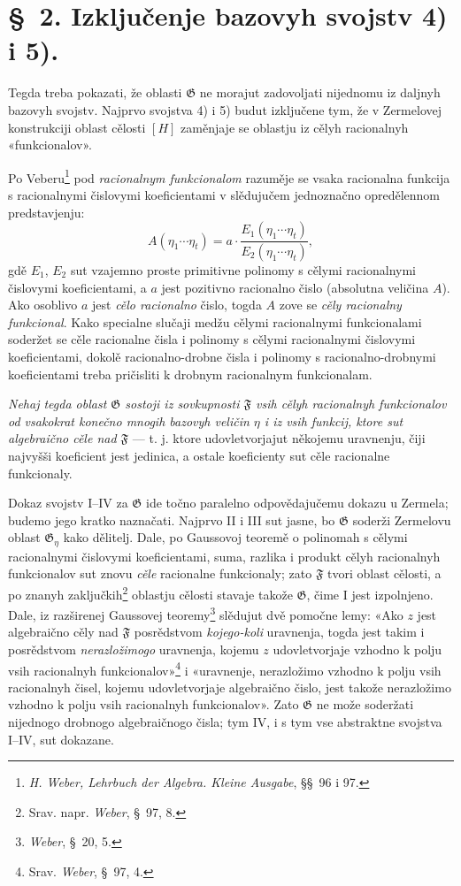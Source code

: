 \documentclass[11pt]{article}
\begin{document}
\section*{\S\ 2. Izključenje bazovyh svojstv 4) i 5).}

Tegda treba pokazati, že oblasti $\mathfrak G$ ne morajut zadovoljati nijednomu iz daljnyh bazovyh svojstv. Najprvo svojstva 4) i 5) budut izključene tym, že v Zermelovej konstrukciji oblast cělosti $[H]$ zaměnjaje se oblastju iz cělyh racionalnyh «funkcionalov».

Po Veberu\footnote{\emph{H. Weber, Lehrbuch der Algebra. Kleine Ausgabe}, \S\S\ 96 i 97.} pod {\itshape racionalnym funkcionalom} razuměje se vsaka racionalna funkcija s racionalnymi čislovymi koeficientami v slědujučem jednoznačno opredělennom predstavjenju:
\[
 A(\eta_1\cdots \eta_t)
   = a\cdot\frac{E_1(\eta_1\cdots \eta_t)}{E_2(\eta_1\cdots \eta_t)},
\]
gdě $E_1$, $E_2$ sut vzajemno proste primitivne polinomy s cělymi racionalnymi čislovymi koeficientami, a $a$ jest pozitivno racionalno čislo (absolutna veličina $A$). Ako osoblivo $a$ jest {\itshape cělo racionalno} čislo, togda $A$ zove se {\itshape cěly racionalny funkcional}. Kako specialne slučaji medžu cělymi racionalnymi funkcionalami soderžet se cěle racionalne čisla i polinomy s cělymi racionalnymi čislovymi koeficientami, dokolě racionalno-drobne čisla i polinomy s racionalno-drobnymi koeficientami treba pričisliti k drobnym racionalnym funkcionalam.

{\itshape Nehaj tegda oblast $\mathfrak G$ sostoji iz sovkupnosti $\mathfrak F$ vsih cělyh racionalnyh funkcionalov od vsakokrat konečno mnogih bazovyh veličin $\eta$ i iz vsih funkcij, ktore sut algebraično cěle nad $\mathfrak F$} --- t. j. ktore udovletvorjajut někojemu uravnenju, čiji najvyšši koeficient jest jedinica, a ostale koeficienty sut cěle racionalne funkcionaly.

Dokaz svojstv I--IV za $\mathfrak G$ ide točno paralelno odpovědajučemu dokazu u Zermela; budemo jego kratko naznačati. Najprvo II i III sut jasne, bo $\mathfrak G$ soderži Zermelovu oblast $\mathfrak G_\eta$ kako dělitelj. Dale, po Gaussovoj teoremě o polinomah s cělymi racionalnymi čislovymi koeficientami, suma, razlika i produkt cělyh racionalnyh funkcionalov sut znovu {\itshape cěle} racionalne funkcionaly; zato $\mathfrak F$ tvori oblast cělosti, a po znanyh zaključkih\footnote{Srav. napr. \emph{Weber}, \S\ 97, 8.} oblastju cělosti stavaje takože $\mathfrak G$, čime I jest izpolnjeno. Dale, iz razširenej Gaussovej teoremy\footnote{\emph{Weber}, \S\ 20, 5.} slědujut dvě pomočne lemy: «Ako $z$ jest algebraično cěly nad $\mathfrak F$ posrědstvom {\itshape kojego-koli} uravnenja, togda jest takim i posrědstvom {\itshape nerazložimogo} uravnenja, kojemu $z$ udovletvorjaje vzhodno k polju vsih racionalnyh funkcionalov»\footnote{Srav. \emph{Weber}, \S\ 97, 4.} i «uravnenje, nerazložimo vzhodno k polju vsih racionalnyh čisel, kojemu udovletvorjaje algebraično čislo, jest takože nerazložimo vzhodno k polju vsih racionalnyh funkcionalov». Zato $\mathfrak G$ ne može soderžati nijednogo drobnogo algebraičnogo čisla; tym IV, i s tym vse abstraktne svojstva I--IV, sut dokazane.
\end{document}

